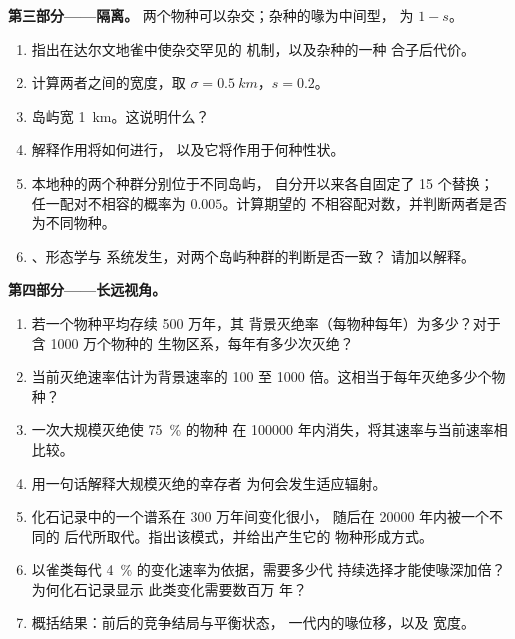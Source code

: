\begin{problem}
\medskip
\noindent\textbf{第三部分——隔离。}
两个物种可以杂交；杂种的喙为中间型，
为 $1 - s$。
\begin{enumerate}[resume]
  \item 指出在达尔文地雀中使杂交罕见的
        机制，以及杂种的一种
        合子后代价。
  \item 计算两者之间的宽度，取 $\sigma
        = \qty{0.5}{km}$，$s = 0.2$。
  \item 岛屿宽 \qty{1}{km}。这说明什么？
  \item 解释作用将如何进行，
        以及它将作用于何种性状。
  \item 本地种的两个种群分别位于不同岛屿，
        自分开以来各自固定了 15 个替换；
        任一配对不相容的概率为 $0.005$。计算期望的
        不相容配对数，并判断两者是否为不同物种。
  \item {}、形态学与
        系统发生，对两个岛屿种群的判断是否一致？
        请加以解释。
\end{enumerate}

\medskip
\noindent\textbf{第四部分——长远视角。}
\begin{enumerate}[resume]
  \item 若一个物种平均存续 500 万年，其
        背景灭绝率（每物种每年）为多少？对于含 1000 万个物种的
        生物区系，每年有多少次灭绝？
  \item 当前灭绝速率估计为背景速率的 100 至 1000
        倍。这相当于每年灭绝多少个物种？
  \item 一次大规模灭绝使 \qty{75}{\%} 的物种
        在 \num{100000} 年内消失，将其速率与当前速率相比较。
  \item 用一句话解释大规模灭绝的幸存者
        为何会发生适应辐射。
  \item 化石记录中的一个谱系在 300 万年间变化很小，
        随后在 \num{20000} 年内被一个不同的
        后代所取代。指出该模式，并给出产生它的
        物种形成方式。
  \item 以雀类每代 \qty{4}{\%} 的变化速率为依据，需要多少代
        持续选择才能使喙深加倍？为何化石记录显示
        此类变化需要数百万
        年？
  \item 概括结果：前后的竞争结局与平衡状态，
        一代内的喙位移，以及
        宽度。
\end{enumerate}
\end{problem}

